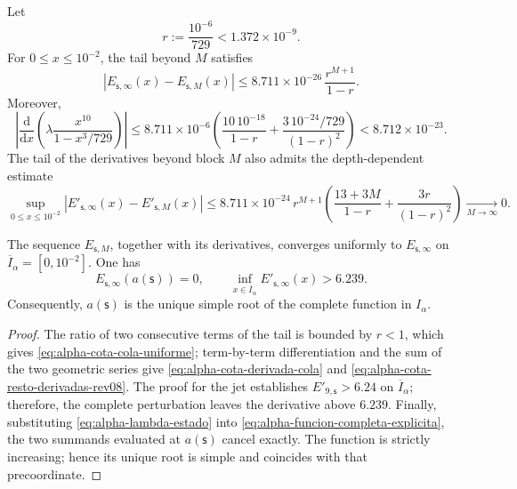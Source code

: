 Let
\[
 r:=\frac{10^{-6}}{729}<1.372\mathbin{\times}10^{-9}.
\]
For \(0\leq x\leq10^{-2}\), the tail beyond \(M\) satisfies
\begin{equation}
 \left|E_{\mathsf s,\infty}(x)-E_{\mathsf s,M}(x)\right|
 \leq
 8.711\mathbin{\times}10^{-26}\,\frac{r^{M+1}}{1-r}.
 \label{eq:alpha-cota-cola-uniforme}
\end{equation}
Moreover,
\begin{equation}
 \left|\frac{\mathrm d}{\mathrm dx}
  \left(\lambda\frac{x^{10}}{1-x^3/729}\right)\right|
 \leq 8.711\mathbin{\times}10^{-6}
 \left(\frac{10\,10^{-18}}{1-r}
 +\frac{3\,10^{-24}/729}{(1-r)^2}\right)
 <8.712\mathbin{\times}10^{-23}.
 \label{eq:alpha-cota-derivada-cola}
\end{equation}
The tail of the derivatives beyond block \(M\) also admits the
depth-dependent estimate
\begin{equation}
 \sup_{0\le x\le10^{-2}}
 \left|E'_{\mathsf s,\infty}(x)-E'_{\mathsf s,M}(x)\right|
 \le 8.711\mathbin{\times}10^{-24}\,r^{M+1}
 \left(\frac{13+3M}{1-r}+\frac{3r}{(1-r)^2}\right)
 \xrightarrow[M\to\infty]{}0.
 \label{eq:alpha-cota-resto-derivadas-rev08}
\end{equation}

\begin{theorem}
\label{thm:alpha-raiz-completa-explicita}
The sequence \(E_{\mathsf s,M}\), together with its derivatives, converges
uniformly to \(E_{\mathsf s,\infty}\) on
\(\overline I_\alpha=[0,10^{-2}]\). One has
\begin{equation}
 E_{\mathsf s,\infty}(a(\mathsf s))=0,
 \qquad
 \inf_{x\in\overline I_\alpha}
 E'_{\mathsf s,\infty}(x)>6.239.
 \label{eq:alpha-raiz-y-derivada-completas}
\end{equation}
Consequently, \(a(\mathsf s)\) is the unique simple root of the complete
function in \(I_\alpha\).
\end{theorem}

\begin{proof}
The ratio of two consecutive terms of the tail is bounded by \(r<1\), which
gives \eqref{eq:alpha-cota-cola-uniforme}; term-by-term differentiation and
the sum of the two geometric series give
\eqref{eq:alpha-cota-derivada-cola} and
\eqref{eq:alpha-cota-resto-derivadas-rev08}. The proof for the jet establishes
\(E'_{9,\mathsf s}>6.24\) on \(\overline I_\alpha\); therefore, the complete
perturbation leaves the derivative above \(6.239\). Finally, substituting
\eqref{eq:alpha-lambda-estado} into
\eqref{eq:alpha-funcion-completa-explicita}, the two summands evaluated at
\(a(\mathsf s)\) cancel exactly. The function is strictly increasing; hence
its unique root is simple and coincides with that precoordinate.
\end{proof}

